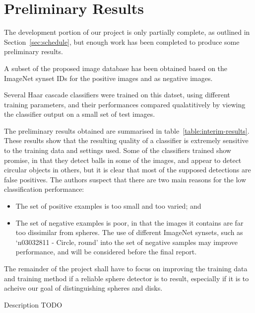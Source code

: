 \documentclass[11pt]{scrartcl}
\begin{document}
    \section{Preliminary Results} {
    \label{sec:results}

        The development portion of our project is only partially complete, as outlined in Section~\ref{sec:schedule}, but enough work has been completed to produce some preliminary results.

        A subset of the proposed image database has been obtained based on the ImageNet synset IDs  for the positive images and  as negative images.

        Several Haar cascade classifiers were trained on this datset, using different training parameters, and their performances compared qualatitively by viewing the classifier output on a small set of test images.

        The preliminary results obtained are summarised in table~\ref{table:interim-results}.
        These results show that the resulting quality of a classifier is extremely sensitive to the training data and settings used.
        Some of the classifiers trained show promise, in that they detect balls in some of the images, and appear to detect circular objects in others, but it is clear that most of the supposed detections are false positives.
        The authors suspect that there are two main reasons for the low classification performance:

        \begin{itemize}
            \item The set of positive examples is too small and too varied; and
            \item The set of negative examples is poor, in that the images it contains are far too dissimilar from spheres.
                  The use of different ImageNet synsets, such as `n03032811 - Circle, round' into the set of negative samples may improve performance, and will be considered before the final report.
        \end{itemize}

        The remainder of the project shall have to focus on improving the training data and training method if a reliable sphere detector is to result, especially if it is to acheive our goal of distinguishing spheres and disks.


        \begin{table}[H]
            \label{table:interim-results}
            \centering
            \makebox[\textwidth][c]{\resizebox{0.5\paperwidth}{!}{}}
            \caption{Description TODO}
        \end{table}

    }
\end{document}
